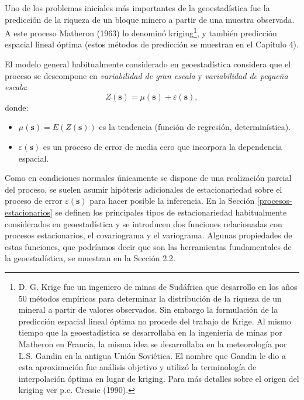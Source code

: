 \documentclass[
  spanish,
]{book}
\theoremstyle{break}
\begin{document}
Uno de los problemas iniciales más importantes de la geoestadística fue la predicción de la riqueza de un bloque minero a partir de una muestra observada.
A este proceso Matheron (1963) lo denominó kriging\footnote{D. G. Krige fue un ingeniero de minas de Sudáfrica que desarrollo
  en los años 50 métodos empíricos para determinar la distribución de
  la riqueza de un mineral a partir de valores observados.
  Sin embargo la formulación de la predicción espacial lineal óptima no
  procede del trabajo de Krige.
  Al mismo tiempo que la geoestadística se desarrollaba en la ingeniería
  de minas por Matheron en Francia, la misma idea se desarrollaba en la
  meteorología por L.S. Gandin en la antigua Unión Soviética.
  El nombre que Gandin le dio a esta aproximación fue análisis objetivo
  y utilizó la terminología de interpolación óptima en lugar de kriging.
  Para más detalles sobre el origen del kriging ver p.e. Cressie (1990).}, y también predicción espacial lineal óptima (estos métodos de predicción se muestran en el Capítulo 4).

El modelo general habitualmente considerado en geoestadística considera que el proceso se descompone en \emph{variabilidad de gran escala} y \emph{variabilidad de pequeña escala}:
\begin{equation}
  Z(\mathbf{s}) = \mu(\mathbf{s}) + \varepsilon(\mathbf{s}),
  \label{eq:modelogeneral}
\end{equation}
donde:

\begin{itemize}
\item
  \(\mu(\mathbf{s}) = E \left( Z(\mathbf{s}) \right)\) es la tendencia (función de regresión, determinística).
\item
  \(\varepsilon(\mathbf{s})\) es un proceso de error de media cero que incorpora la dependencia espacial.
\end{itemize}

Como en condiciones normales únicamente se dispone de una realización parcial del proceso, se suelen asumir hipótesis adicionales de estacionariedad sobre el proceso de error \(\varepsilon(\mathbf{s})\) para hacer posible la inferencia.
En la Sección \ref{procesos-estacionarios} se definen los principales tipos de estacionariedad habitualmente considerados en geoestadística y se introducen dos funciones relacionadas con procesos estacionarios, el covariograma y el variograma.
Algunas propiedades de estas funciones, que podríamos decir que son las herramientas fundamentales de la geoestadística, se muestran en la Sección 2.2.
\end{document}
